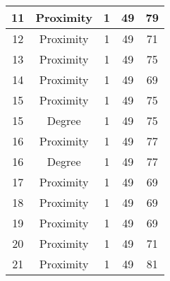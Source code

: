 \documentclass[results.tex]{subfiles}
\begin{document}
\begin{center}
\begin{tabular}{| c || c | c | c | c |}
            \hline
            11                      & Proximity                    & 1                      & 49                      & 79                   \\
            \hline
            12                      & Proximity                    & 1                      & 49                      & 71                   \\
            \hline
            13                      & Proximity                    & 1                      & 49                      & 75                   \\
            \hline
            14                      & Proximity                    & 1                      & 49                      & 69                   \\
            \hline
            15                      & Proximity                    & 1                      & 49                      & 75                   \\
            \hline
            15                      & Degree                       & 1                      & 49                      & 75                   \\
            \hline
            16                      & Proximity                    & 1                      & 49                      & 77                   \\
            \hline
            16                      & Degree                       & 1                      & 49                      & 77                   \\
            \hline
            17                      & Proximity                    & 1                      & 49                      & 69                   \\
            \hline
            18                      & Proximity                    & 1                      & 49                      & 69                   \\
            \hline
            19                      & Proximity                    & 1                      & 49                      & 69                   \\
            \hline
            20                      & Proximity                    & 1                      & 49                      & 71                   \\
            \hline
            21                      & Proximity                    & 1                      & 49                      & 81                   \\

\end{tabular}
\end{center}
\end{document}
